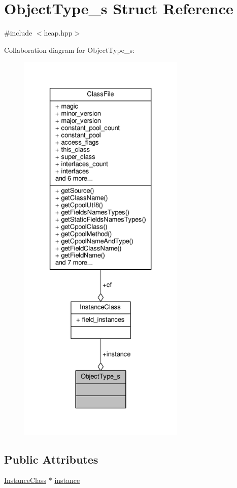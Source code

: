 \hypertarget{structObjectType__s}{\section{Object\+Type\+\_\+s Struct Reference}
\label{structObjectType__s}
}


{\ttfamily \#include $<$heap.\+hpp$>$}



Collaboration diagram for Object\+Type\+\_\+s\+:
\nopagebreak
\begin{figure}[H]
\begin{center}
\leavevmode
\includegraphics[height=550pt]{structObjectType__s__coll__graph}
\end{center}
\end{figure}
\subsection*{Public Attributes}
\begin{DoxyCompactItemize}
\item 
\hyperlink{classInstanceClass}{Instance\+Class} $\ast$ \hyperlink{structObjectType__s_ace1fa4b359f32f92954516a5de896350}{instance}
\end{DoxyCompactItemize}


